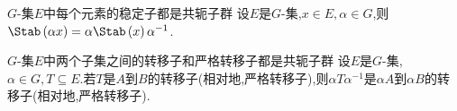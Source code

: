\begin{proposition}{$G$-集$E$中每个元素的稳定子都是共轭子群}{}
	设$E$是$G$-集,$x\in E,\alpha\in G$,则$\Stab\left(\alpha x\right)=\alpha\Stab\left(x\right)\alpha^{-1}$.
\end{proposition}

\begin{proposition}{$G$-集$E$中两个子集之间的转移子和严格转移子都是共轭子群}{}
	设$E$是$G$-集,$\alpha\in G,T\subseteq E$.若$T$是$A$到$B$的转移子(相对地,严格转移子),则$\alpha T\alpha^{-1}$是$\alpha A$到$\alpha B$的转移子(相对地,严格转移子).
\end{proposition}




















